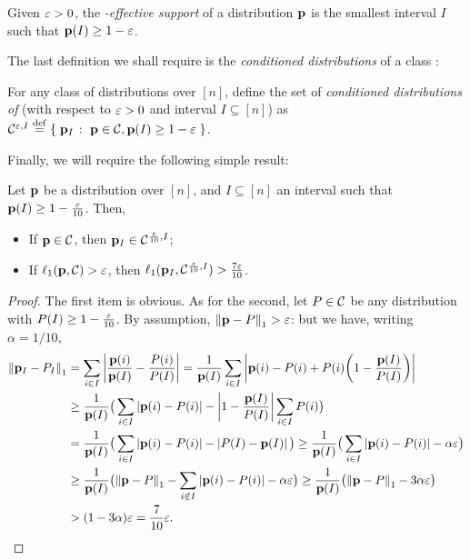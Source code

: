 \begin{definition}\label{def:effective:support}
Given $\eps > 0$, the \emph{\eps-effective support} of a distribution $\D$ is the smallest interval $I$ such that $\D(I) \geq 1-\eps$.
\end{definition}

The last definition we shall require is  the \emph{conditioned distributions} of a class \class:
\begin{definition}
For any class of distributions \class over $[n]$, define the set of \emph{conditioned distributions of \class} (with respect to $\eps > 0$ and interval $I\subseteq[n]$) as $\class^{\eps,I}\eqdef \setOfSuchThat{\D_I}{\D\in\class, \D(I) \geq 1-\eps}$.
\end{definition}

Finally, we will require the following simple result:
\begin{lemma}\label{lemma:conditioned:class}
Let $\D$ be a distribution over $[n]$, and $I\subseteq[n]$ an interval such that $\D(I) \geq 1- \frac{\eps}{10}$. Then,
\begin{itemize}
  \item If $\D\in\class$, then $\D_I\in\class^{\frac{\eps}{10},I}$;
  \item If $\lp[1](\D,\class) > \eps$, then $\lp[1](\D_I, \class^{\frac{\eps}{10},I}) > \frac{7\eps}{10}$.
\end{itemize}
\end{lemma}
\begin{proof}
The first item is obvious. As for the second, let $P\in\class$ be any distribution with $P(I)\geq 1-\frac{\eps}{10}$. By assumption, $\normone{\D - P} > \eps$: but we have, writing $\alpha=1/10$,
  \begin{align*}
    \normone{\D_I - P_I} &=\sum_{i\in I}\abs{ \frac{\D(i)}{\D(I)} - \frac{P(i)}{P(I)} }
    = \frac{1}{\D(I)}\sum_{i\in I}\abs{ \D(i) - P(i) + P(i)\mleft(1- \frac{\D(I)}{P(I)}\mright) } \\
    &\geq \frac{1}{\D(I)}\big( \sum_{i\in I}\abs{ \D(i) - P(i) } - \abs{1- \frac{\D(I)}{P(I)} } \sum_{i\in I} P(i) \big)\\
    &= \frac{1}{\D(I)}\big( \sum_{i\in I}\abs{ \D(i) - P(i) } - \abs{P(I)- \D(I) } \big)
    \geq \frac{1}{\D(I)}\big( \sum_{i\in I}\abs{ \D(i) - P(i) } - \alpha\eps \big)\\
   &\geq \frac{1}{\D(I)}\big( \normone{\D-P} - \sum_{i\notin I} \abs{ \D(i) - P(i) } - \alpha\eps \big)
   \geq \frac{1}{\D(I)}\big( \normone{\D-P} - 3\alpha\eps \big) \\
   &> (1- 3\alpha)\eps  
   = \frac{7}{10}\eps.
  \end{align*}
\end{proof}


